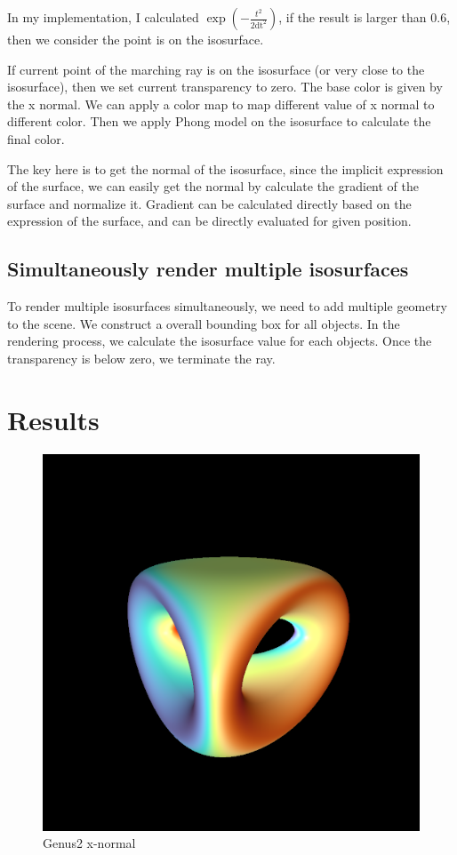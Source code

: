 \documentclass[acmtog]{acmart}
\begin{document}
In my implementation, I calculated 
\(\exp(-\frac{t^2}{2\mathrm{dt}^2})\), if the result is larger than 0.6, then we consider the point is on the isosurface.

If current point of the marching ray is on the isosurface (or very close to the isosurface), then we set current transparency to zero. The base color is given by the x normal. We can apply a color map to map different value of x normal to different color. Then we apply Phong model on the isosurface to calculate the final color. 

The key here is to get the normal of the isosurface, since the implicit expression of the surface, we can easily get the normal by calculate the gradient of the surface and normalize it. Gradient can be calculated directly based on the expression of the surface, and can be directly evaluated for given position.

\subsection{Simultaneously render multiple isosurfaces}
To render multiple isosurfaces simultaneously, we need to add multiple geometry to the scene.
We construct a overall bounding box for all objects. In the rendering process, we calculate the isosurface value for each objects. Once the transparency is below zero, we terminate the ray.

\section{Results}
\begin{figure}[h]
    \centering
    \includegraphics[scale=0.35]{../Coding/images/fw_genus2_x_grad.png}
    \caption{Genus2 x-normal}
\end{figure}
\end{document}
